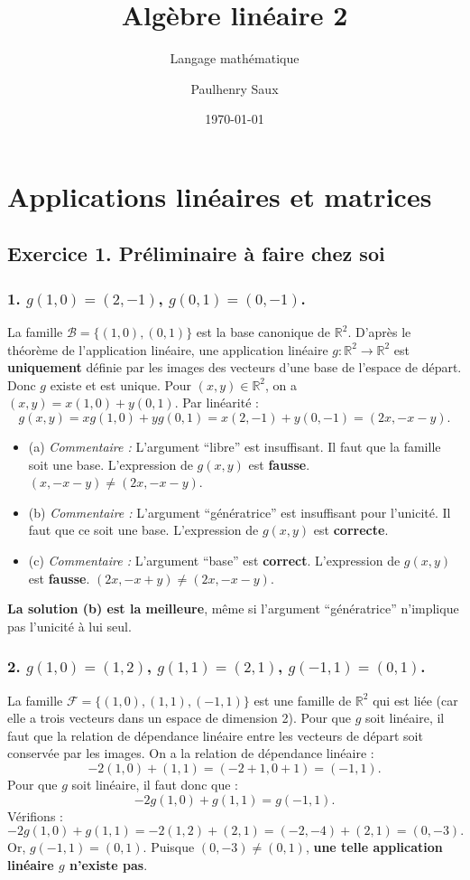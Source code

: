\documentclass[french]{yLectureNote}
\title{Algèbre linéaire 2}
\subtitle{Langage mathématique}
\author{Paulhenry Saux}
\date{\today}
\begin{document}
\chapter{Applications linéaires et matrices}
\section*{Exercice 1. Préliminaire à faire chez soi}

\subsection*{1. $g(1,0)=(2,-1)$, $g(0,1)=(0,-1)$.}
La famille $\mathcal{B} = \{(1,0), (0,1)\}$ est la base canonique de $\mathbb{R}^2$.
D'après le théorème de l'application linéaire, une application linéaire $g: \mathbb{R}^2 \to \mathbb{R}^2$ est \textbf{uniquement} définie par les images des vecteurs d'une base de l'espace de départ.
Donc $g$ existe et est unique.
Pour $(x,y) \in \mathbb{R}^2$, on a $(x,y) = x(1,0) + y(0,1)$.
Par linéarité :
$$g(x,y) = x g(1,0) + y g(0,1) = x(2,-1) + y(0,-1) = (2x, -x-y).$$
\begin{itemize}
    \item (a) \emph{Commentaire :} L'argument ``libre'' est insuffisant. Il faut que la famille soit une base. L'expression de $g(x,y)$ est \textbf{fausse}. $(x,-x-y) \ne (2x, -x-y)$.
    \item (b) \emph{Commentaire :} L'argument ``génératrice'' est insuffisant pour l'unicité. Il faut que ce soit une base. L'expression de $g(x,y)$ est \textbf{correcte}.
    \item (c) \emph{Commentaire :} L'argument ``base'' est \textbf{correct}. L'expression de $g(x,y)$ est \textbf{fausse}. $(2x,-x+y) \ne (2x, -x-y)$.
\end{itemize}
\textbf{La solution (b) est la meilleure}, même si l'argument ``génératrice'' n'implique pas l'unicité à lui seul.

\subsection*{2. $g(1,0)=(1,2)$, $g(1,1)=(2,1)$, $g(-1,1)=(0,1)$.}
La famille $\mathcal{F} = \{(1,0), (1,1), (-1,1)\}$ est une famille de $\mathbb{R}^2$ qui est liée (car elle a trois vecteurs dans un espace de dimension 2). Pour que $g$ soit linéaire, il faut que la relation de dépendance linéaire entre les vecteurs de départ soit conservée par les images.
On a la relation de dépendance linéaire :
$$-2(1,0) + (1,1) = (-2+1, 0+1) = (-1,1).$$
Pour que $g$ soit linéaire, il faut donc que :
$$-2g(1,0) + g(1,1) = g(-1,1).$$
Vérifions :
$$ -2g(1,0) + g(1,1) = -2(1,2) + (2,1) = (-2, -4) + (2,1) = (0, -3).$$
Or, $g(-1,1) = (0,1)$.
Puisque $(0, -3) \ne (0,1)$, \textbf{une telle application linéaire $g$ n'existe pas}.
\end{document}
